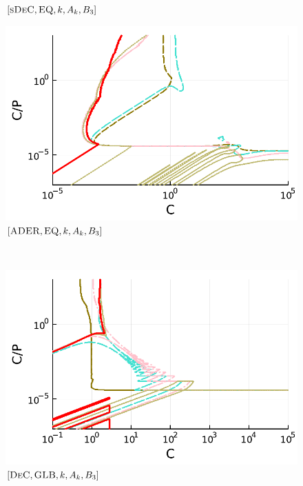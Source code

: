 \begin{figure}
\begin{minipage}[t]{0.325\textwidth}
	\small$[\textsc{sDeC}, \textsc{EQ},k,A_k,B_3]$\par
	\end{minipage}
	\begin{minipage}[t]{0.325\textwidth}
		\centering
		\includegraphics[width=\textwidth]{pdf/pdepics/disp/IMEXADER_equispaced_disp_advTMM_2-6_newE.pdf}
		\small$[\textsc{ADER}, \textsc{EQ},k,A_k,B_3]$\par
	\end{minipage}\\
	\begin{minipage}[t]{0.325\textwidth}
		\centering
		\includegraphics[width=\textwidth]{pdf/pdepics/disp/IMEXDeC_gaussLobatto_disp_advTMM_2-6_newE.pdf}
		\small$[\textsc{DeC}, \textsc{GLB},k,A_k,B_3]$\par
	\end{minipage}
	\begin{minipage}[t]{0.325\textwidth}
		\centering

\end{minipage}
\end{figure}
